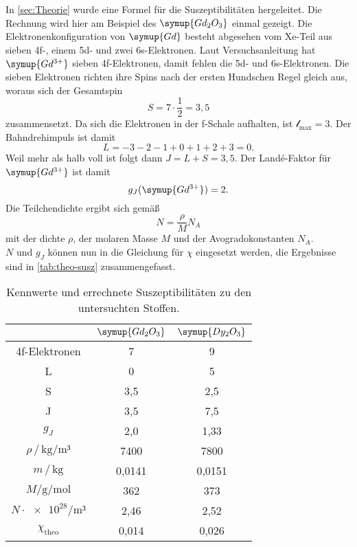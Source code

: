 In \autoref{sec:Theorie} wurde eine Formel für die Suszeptibilitäten hergeleitet. Die
Rechnung wird hier am Beispiel des $\symup{Gd_2O_3}$ einmal gezeigt. Die
Elektronenkonfiguration von $\symup{Gd}$ besteht abgesehen vom Xe-Teil aus sieben 4f-,
einem 5d- und zwei 6s-Elektronen.
Laut Versuchsanleitung hat $\symup{Gd^{3+}}$ sieben 4f-Elektronen, damit fehlen die 5d-
und 6s-Elektronen. Die sieben Elektronen richten ihre Spins nach der ersten Hundschen Regel gleich
aus, woraus sich der Gesamtspin
\[
	S = 7 \cdot \frac 12 = 3,5
\]
zusammensetzt. Da sich die Elektronen in der f-Schale aufhalten, ist
$\mathcal{l}_\text{max} = 3$. Der Bahndrehimpuls ist damit
\[
	L = -3 -2 -1 + 0 + 1 + 2 + 3 = 0.
\]
Weil mehr als halb voll ist folgt dann $J = L + S = 3,5$. Der Landé-Faktor für
$\symup{Gd^{3+}}$ ist damit
\[
	g_J(\symup{Gd^{3+}}) = 2.
\]
Die Teilchendichte ergibt sich gemäß
\[
	N = \frac{\rho}{M} N_A
\]
mit der dichte $\rho$, der molaren Masse $M$ und der Avogradokonstanten $N_A$.
\\
$N$ und $g_J$ können nun in die Gleichung für $\chi$ eingesetzt werden, die Ergebnisse
sind in \autoref{tab:theo-susz} zusammengefasst.
\begin{table}
  \centering
  \caption{Kennwerte und errechnete Suszeptibilitäten zu den untersuchten Stoffen.}
  \label{tab:theo-susz}
  \begin{tabular}{c c c}
  \toprule
   & $\symup{Gd_2O_3}$ 	& $\symup{Dy_2O_3}$\\
  \midrule
  4f-Elektronen                           & 7      & 9      \\
L                                         & 0      & 5      \\
S                                         & 3,5    & 2,5    \\
J                                         & 3,5    & 7,5    \\
$g_J$                                     & 2,0    & 1,33   \\
$\rho \, / \, \si{\kilo\gram\per\meter³}$ & 7400   & 7800   \\
$m \, / \, \si{\kilo\gram}$               & 0,0141 & 0,0151 \\
$M/\si{\gram\per\mol}$           	  & 362   & 373   \\
$N \cdot \num{e28}/\si{\meter³}$ 	  & 2,46  & 2,52  \\
$\chi_\text{theo}$               	  & 0,014 & 0,026 \\
  \bottomrule
  \end{tabular}
\end{table}

